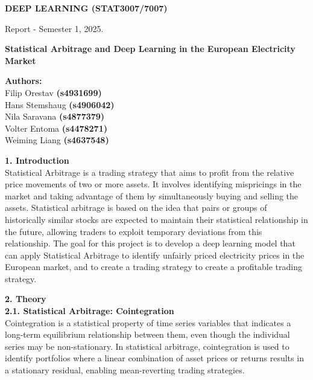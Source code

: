 \documentclass[12pt]{article}
\begin{document}
\begin{center}

{\Large  {\bf DEEP LEARNING (STAT3007/7007)}

Report - Semester 1, 2025.

\textbf{Statistical Arbitrage and Deep Learning in the European Electricity Market} \\

\vspace{20pt}

{\large
\textbf{Authors:} \\
Filip Orestav \textbf{(s4931699)} \\
Hans Stemshaug \textbf{(s4906042)} \\
Nila Saravana \textbf{(s4877379)} \\
Volter Entoma \textbf{(s4478271)} \\
Weiming Liang \textbf{(s4637548)}
}

}
\end{center}

\vspace{20pt}

\textbf{1. Introduction}
\\
Statistical Arbitrage is a trading strategy that aims to profit from the relative price movements of two or more assets. It involves identifying mispricings in the market and taking advantage of them by simultaneously buying and selling the assets. Statistical arbitrage is based on the idea that pairs or groups of historically similar stocks are expected to maintain their statistical relationship in the future, allowing traders to exploit temporary deviations from this relationship. The goal for this project is to develop a deep learning model that can apply Statistical Arbitrage to identify unfairly priced electricity prices in the European market, and to create a trading strategy to create a profitable trading strategy.
\\

\vspace{20pt}

\textbf{2. Theory}
\\
\textbf{2.1. Statistical Arbitrage: Cointegration}
\\
Cointegration is a statistical property of time series variables that indicates a long-term equilibrium relationship between them, even though the individual series may be non-stationary. In statistical arbitrage, cointegration is used to identify portfolios where a linear combination of asset prices or returns results in a stationary residual, enabling mean-reverting trading strategies. \\
\end{document}
